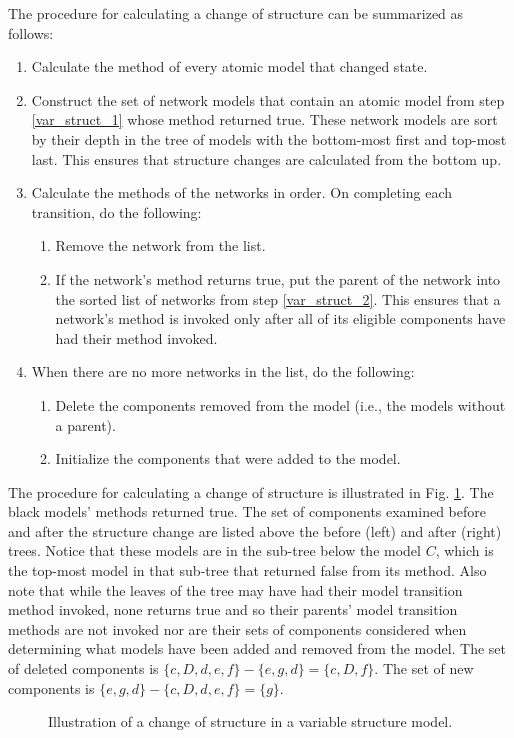 The procedure for calculating a change of structure can be summarized as follows:
\begin{enumerate}
\item Calculate the  method of every atomic model that changed state.\label{var_struct_1}
\item Construct the set of network models that contain an atomic model from step \ref{var_struct_1} whose  method returned true. These network models are sort by their depth in the tree of models with the bottom-most first and top-most last. This ensures that structure changes are calculated from the bottom up. \label{var_struct_2}
\item Calculate the  methods of the networks in order. On completing each transition, do the following:
\begin{enumerate}
\item Remove the network from the list.
\item If the network's  method returns true, put the parent of the network into the sorted list of networks from step \ref{var_struct_2}. This ensures that a network's  method is invoked only after all of its eligible components have had their  method invoked.
\end{enumerate}
\item When there are no more networks in the list, do the following:
\begin{enumerate}
\item Delete the components removed from the model (i.e., the models without a parent).
\item Initialize the components that were added to the model.
\end{enumerate}
\end{enumerate}

The procedure for calculating a change of structure is illustrated in Fig. \ref{fig:set_defns}. The black models'  methods returned true. The set of components examined before and after the structure change are listed above the before (left) and after (right) trees. Notice that these models are in the sub-tree below the model $C$, which is the top-most model in that sub-tree that returned false from its  method. Also note that while the leaves of the tree may have had their model transition method invoked, none returns true and so their parents' model transition methods are not invoked nor are their sets of components considered when determining what models have been added and removed from the model. The set of deleted components is $\{c,D,d,e,f\}-\{e,g,d\} = \{c,D,f\}$. The set of new components is $\{e,g,d\} - \{c,D,d,e,f\} = \{g\}$.
\begin{figure}[ht]
\centering
{}
\caption{Illustration of a change of structure in a variable structure model.}
\label{fig:set_defns}
\end{figure}

